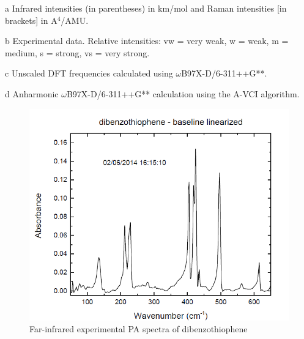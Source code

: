 \begin{table}[H]
\begin{center}
\begin{threeparttable}[b]
				\begin{tablenotes}
					\item[a] Infrared intensities (in parentheses) in km/mol and Raman intensities [in brackets] in A$^{4}$/AMU.
					\item[b] Experimental data. Relative intensities: vw = very weak, w = weak, m = medium, s = strong, vs = very strong.
					\item[c] Unscaled DFT frequencies calculated using $\omega$B97X-D/6-311++G**.
					\item[d] Anharmonic $\omega$B97X-D/6-311++G** calculation using the A-VCI algorithm\cite{garnier2016adaptive}.
				\end{tablenotes}
			\end{threeparttable}
		\end{center}
	\end{table}
	
	
	\begin{figure}[H]
		\centering
		\includegraphics[scale=0.53]{image/image/Spectra-diben}  
		\caption{Far-infrared experimental PA spectra of dibenzothiophene} \label{P1-spectradiben}
	\end{figure}
	
	
	
